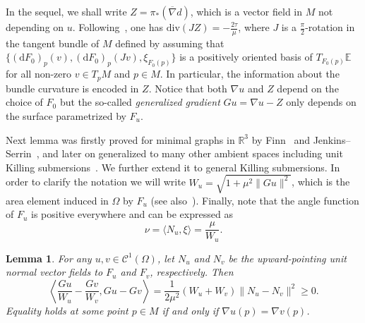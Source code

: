 \documentclass[a4paper,10pt,reqno]{amsart}
\newcommand{\R}{\mathbb{R}}
\newcommand{\df}{\mathrm{d}}
\newcommand{\E}{\mathbb{E}}
\newtheorem{lemma}[theorem]{Lemma}
\theoremstyle{definition}
\theoremstyle{remark}
\numberwithin{equation}{section}
\begin{document}
In the sequel, we shall write $Z=\pi_*(\overline\nabla d)$, which is a vector field in $M$ not depending on $u$. Following~\cite{LerMan}, one has $\mathrm{div}(JZ)=-\frac{2\tau}{\mu}$, where $J$ is a $\frac\pi2$-rotation in the tangent bundle of $M$ defined by assuming that $\{(\df F_0)_p(v),(\df F_0)_p(Jv),\xi_{F_0(p)}\}$ is a positively oriented basis of $T_{F_0(p)}\E$ for all non-zero $v\in T_pM$ and $p\in M$. In particular, the information about the bundle curvature is encoded in $Z$. Notice that both $\nabla u$ and $Z$ depend on the choice of $F_0$ but the so-called \emph{generalized gradient} $Gu=\nabla u-Z$ only depends on the surface parametrized by $F_u$. 
			
Next lemma was firstly proved for minimal graphs in $\R^3$ by Finn~\cite{F} and Jenkins--Serrin~\cite{JS}, and later on generalized to many other ambient spaces including unit Killing submersions~\cite{LR}. We further extend it to general Killing submersions. In order to clarify the notation we will write $W_u=\sqrt{1+\mu^{2}\|Gu\|^2}$, which is the area element induced in $\Omega$ by $F_u$ (see also~\cite[\S2]{DLM}). Finally, note that the angle function of $F_u$ is positive everywhere and can be expressed as 
\begin{equation}\label{eqn:nu}
\nu=\langle N_u,\xi\rangle=\frac{\mu}{W_u}.
\end{equation}
			
\begin{lemma}\label{lemma:factorization}
	For any $u,v\in\mathcal{C}^1(\Omega)$, let $N_u$ and $N_v$ be the upward-pointing unit normal vector fields to $F_u$ and $F_v$, respectively. Then
	\[\left\langle\frac{Gu}{W_u}-\frac{Gv}{W_v},Gu-Gv\right\rangle=\frac{1}{2\mu^2}(W_u+W_v)\|N_u-N_v\|^2\geq 0.\]
	Equality holds at some point $p\in M$ if and only if $\nabla u(p)=\nabla v(p)$.
\end{lemma}
		
\end{document}
